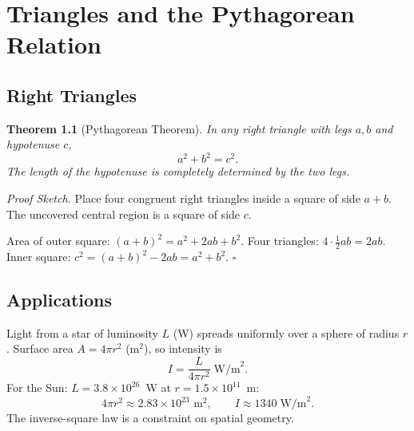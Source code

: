 \documentclass[11pt, openany]{book}
\theoremstyle{plain}
\newtheorem{theorem}{Theorem}[chapter]
\theoremstyle{definition}
\theoremstyle{remark}
\newenvironment{proofsketch}{\noindent\textit{Proof Sketch.}\;}{\hfill$\square$\par\medskip}
\begin{document}
\chapter{Triangles and the Pythagorean Relation}

\section{Right Triangles}

\begin{theorem}[Pythagorean Theorem]
In any right triangle with legs $a,b$ and hypotenuse $c$,
\[
  a^2+b^2=c^2.
\]
The length of the hypotenuse is completely determined by the two legs.
\end{theorem}

\begin{proofsketch}
Place four congruent right triangles inside a square of side $a+b$.
The uncovered central region is a square of side $c$.

\begin{center}
\end{center}
Area of outer square: $(a+b)^2=a^2+2ab+b^2$. Four triangles: $4\cdot\tfrac12ab=2ab$.
Inner square: $c^2=(a+b)^2-2ab=a^2+b^2$.
\end{proofsketch}

\section{Applications}

\begin{myexample}
Light from a star of luminosity $L$ (W) spreads uniformly over a sphere of
radius $r$. Surface area $A=4\pi r^2$ (m$^2$), so intensity is
\[
  I = \frac{L}{4\pi r^2}\;\text{W/m}^2.
\]
For the Sun: $L=3.8\times10^{26}$~W at $r=1.5\times10^{11}$~m:
\[
  4\pi r^2\approx 2.83\times10^{23}\text{ m}^2,\qquad
  I\approx1340\;\text{W/m}^2.
\]
The inverse-square law is a constraint on spatial geometry.
\end{myexample}
\end{document}
